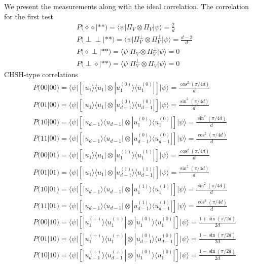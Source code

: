 \documentclass[11pt,letterpaper]{article}
\newcommand{\ket}[1]{|#1\rangle}
\newcommand{\bra}[1]{\langle#1|}
\newcommand{\ketbra}[2]{|#1\rangle\langle#2|}
\newcommand{\1}{\mathbb{1}}
\theoremstyle{definition}
\begin{document}
We present the measurements along with the ideal correlation.
The correlation for the first test
\begin{align}
	&P(\diamond \diamond| \ast \ast) = \bra{\psi} \Pi_V \otimes \Pi_V \ket{\psi} = \frac{2}{d}\\
	&P(\perp \perp| \ast \ast) = \bra{\psi} \Pi_V^\perp \otimes \Pi_V^\perp \ket{\psi} = \frac{d-2}{d}\\
	&P(\diamond \perp| \ast \ast) = \bra{\psi} \Pi_V \otimes \Pi_V^\perp \ket{\psi} = 0\\
	&P(\perp \diamond| \ast \ast) = \bra{\psi} \Pi_V^\perp \otimes \Pi_V \ket{\psi} = 0
\end{align}
CHSH-type correlations
\begin{align}
	&P(00|00) = \bra{\psi}  \left[\ketbra{u_1}{u_1}\otimes \ketbra{u_1^{(0)}}{u_1^{(0)}}\right]\ket{\psi} = \frac{\cos^2(\pi/4d)}{d}\\
	&P(01|00) = \bra{\psi}  \left[\ketbra{u_1}{u_1}\otimes \ketbra{u_{d-1}^{(0)}}{u_{d-1}^{(0)}}\right]\ket{\psi} = \frac{\sin^2(\pi/4d)}{d}\\
	&P(10|00) = \bra{\psi}  \left[\ketbra{u_{d-1}}{u_{d-1}}\otimes \ketbra{u_1^{(0)}}{u_1^{(0)}}\right]\ket{\psi} = \frac{\sin^2(\pi/4d)}{d}\\
	&P(11|00) = \bra{\psi}  \left[\ketbra{u_{d-1}}{u_{d-1}}\otimes \ketbra{u_{d-1}^{(0)}}{u_{d-1}^{(0)}}\right]\ket{\psi} = \frac{\cos^2(\pi/4d)}{d}\\
	&P(00|01) = \bra{\psi}  \left[\ketbra{u_1}{u_1}\otimes \ketbra{u_1^{(1)}}{u_1^{(1)}}\right]\ket{\psi} = \frac{\cos^2(\pi/4d)}{d}\\
	&P(01|01) = \bra{\psi}  \left[\ketbra{u_1}{u_1}\otimes \ketbra{u_{d-1}^{(1)}}{u_{d-1}^{(1)}}\right]\ket{\psi} = \frac{\sin^2(\pi/4d)}{d}\\
	&P(10|01) = \bra{\psi}  \left[\ketbra{u_{d-1}}{u_{d-1}}\otimes \ketbra{u_1^{(1)}}{u_1^{(1)}}\right]\ket{\psi} = \frac{\sin^2(\pi/4d)}{d}\\
	&P(11|01) = \bra{\psi}  \left[\ketbra{u_{d-1}}{u_{d-1}}\otimes \ketbra{u_{d-1}^{(1)}}{u_{d-1}^{(1)}}\right]\ket{\psi} = \frac{\cos^2(\pi/4d)}{d}\\
	&P(00|10) = \bra{\psi}  \left[\ketbra{u_1^{(+)}}{u_1^{(+)}}\otimes \ketbra{u_1^{(0)}}{u_1^{(0)}}\right]\ket{\psi} = \frac{1+\sin(\pi/2d)}{2d}\\
	&P(01|10) = \bra{\psi}  \left[\ketbra{u_1^{(+)}}{u_1^{(+)}}\otimes \ketbra{u_{d-1}^{(0)}}{u_{d-1}^{(0)}}\right]\ket{\psi} = \frac{1-\sin(\pi/2d)}{2d}\\
	&P(10|10) = \bra{\psi}  \left[\ketbra{u_{d-1}^{(+)}}{u_{d-1}^{(+)}}\otimes \ketbra{u_1^{(0)}}{u_1^{(0)}}\right]\ket{\psi} = \frac{1-\sin(\pi/2d)}{2d}\\

\end{align}
\end{document}
